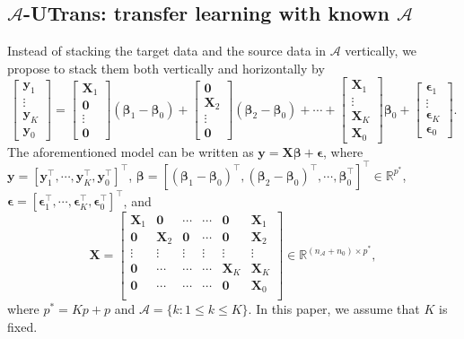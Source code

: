 \documentclass[twoside,12pt]{article}
\newcommand{\mb}[1]{\boldsymbol{\mathbf{#1}}}
\begin{document}
	\subsection{$\mathcal A$-UTrans: transfer learning with known $\mathcal A$}
 \label{sec: AUTrans}
	Instead of stacking the target data and the source data in $\mathcal A$ vertically, we propose to stack them both vertically and horizontally by 
	\begin{equation*}
	\left[\begin{array}{c}
		\mb y_{1} \\
		\vdots\\
		\mb y_K\\
		\mb y_{0}
	\end{array}\right]=\left[\begin{array}{c}
		\mb X_{1} \\
		\mb 0\\
		\vdots\\
		\mb 0
	\end{array}\right]\left(\mb\beta_{1}-\mb\beta_{0}\right)+\left[\begin{array}{c}
	\mb 0 \\
	\mb X_2\\
	\vdots\\
	\mb 0
\end{array}\right]\left(\mb\beta_{2}-\mb\beta_{0}\right)+\cdots+\left[\begin{array}{c}
		\mb X_{1} \\
		\vdots\\
		\mb X_K\\
		\mb X_{0}
	\end{array}\right] \mb\beta_{0}+\left[\begin{array}{c}
		\mb\epsilon_{1} \\
		\vdots\\
		\mb\epsilon_{K}\\
		\mb\epsilon_{0}
	\end{array}\right].
	\end{equation*}
	The aforementioned model can be written as $\mb y=\mb X\mb\beta+\mb\epsilon$, where 
	$\mb y=[\mb y_1^\top,\cdots, \mb y_K^\top, \mb y_0^\top]^\top$, $\mb\beta=[(\mb\beta_1-\mb\beta_0)^\top, (\mb\beta_2-\mb\beta_0)^\top, \cdots, \mb\beta_0^\top]^\top\in\mathbb{R}^{p^*}$, $\mb\epsilon=[\mb\epsilon_{1}^\top, \cdots, \mb\epsilon_{K}^\top, \mb\epsilon_{0}^\top]^\top$, and
	\begin{equation}
		\label{eq: X}
	\mb X=\begin{bmatrix}
		\mb X_1 & \mb 0 & \cdots&\cdots&\mb 0&\mb X_1\\
		\mb 0 & \mb X_2 & \mb 0&\cdots&\mb 0&\mb X_2\\
		\vdots&\vdots&\vdots&\vdots&\vdots&\vdots\\
		\mb 0& \cdots&\cdots&\cdots&\mb X_K&\mb X_K\\
		\mb 0& \cdots&\cdots&\cdots&\mb 0&\mb X_0\\
	\end{bmatrix}\in\mathbb{R}^{(n_{\mathcal A}+n_0)\times p^*},
\end{equation}
where $p^*=Kp+p$ and $\mathcal{A}=\{k:1\leq k\leq K\}$.
In this paper, we assume that $K$ is fixed.
	
\end{document}
